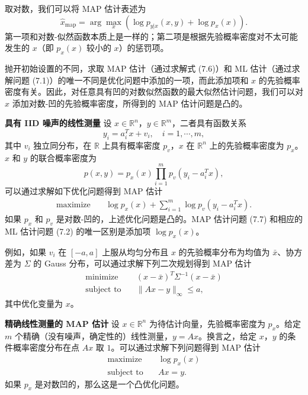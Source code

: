 \documentclass[UTF8, 12pt, fontset=fandol, oneside]{ctexart}
\begin{document}
取对数，我们可以将 MAP 估计表述为
\begin{equation}
\hat{x}_{\mathrm{map}}=\arg\max_x\left(\log p_{y|x}(x,y)+\log p_x(x)\right).
\tag{7.6}
\end{equation}
第一项和对数-似然函数本质上是一样的；第二项是根据先验概率密度对不太可能发生的 $x$（即 $p_x(x)$ 较小的 $x$）的惩罚项。

抛开初始设置的不同，求取 MAP 估计（通过求解式 (7.6)）和 ML 估计（通过求解问题 (7.1)）的唯一不同是优化问题中添加的一项，而此添加项和 $x$ 的先验概率密度有关。因此，对任意具有凹的对数似然函数的最大似然估计问题，我们可以对 $x$ 添加对数-凹的先验概率密度，所得到的 MAP 估计问题是凸的。

\noindent\textbf{具有 IID 噪声的线性测量}\quad
设 $x\in\mathbb{R}^n$，$y\in\mathbb{R}^m$，二者具有函数关系
\[
y_i=a_i^T x+v_i,\quad i=1,\cdots,m,
\]
其中 $v_i$ 独立同分布，在 $\mathbb{R}$ 上具有概率密度 $p_v$，$x$ 在 $\mathbb{R}^n$ 上的先验概率密度为 $p_x$。$x$ 和 $y$ 的联合概率密度为
\[
p(x,y)=p_x(x)\prod_{i=1}^m p_v(y_i-a_i^T x),
\]
可以通过求解如下优化问题得到 MAP 估计
\begin{equation}
\begin{aligned}
\text{maximize}\quad & \log p_x(x)+\sum_{i=1}^m \log p_v(y_i-a_i^T x).
\end{aligned}
\tag{7.7}
\end{equation}
如果 $p_x$ 和 $p_v$ 是对数-凹的，上述优化问题是凸的。MAP 估计问题 (7.7) 和相应的 ML 估计问题 (7.2) 的唯一区别是添加项 $\log p_x(x)$。

例如，如果 $v_i$ 在 $[-a,a]$ 上服从均匀分布且 $x$ 的先验概率分布为均值为 $\bar{x}$、协方差为 $\Sigma$ 的 Gauss 分布，可以通过求解下列二次规划得到 MAP 估计
\[
\begin{aligned}
\text{minimize}\quad & (x-\bar{x})^T\Sigma^{-1}(x-\bar{x})\\
\text{subject to}\quad & \|Ax-y\|_\infty\leq a,
\end{aligned}
\]
其中优化变量为 $x$。

\noindent\textbf{精确线性测量的 MAP 估计}\quad
设 $x\in\mathbb{R}^n$ 为待估计向量，先验概率密度为 $p_x$。给定 $m$ 个精确（没有噪声，确定性的）线性测量，$y=Ax$。换言之，给定 $x$，$y$ 的条件概率密度分布在点 $Ax$ 取 $1$。可以通过求解下列问题得到 MAP 估计
\[
\begin{aligned}
\text{maximize}\quad & \log p_x(x)\\
\text{subject to}\quad & Ax=y.
\end{aligned}
\]
如果 $p_x$ 是对数凹的，那么这是一个凸优化问题。
\end{document}
